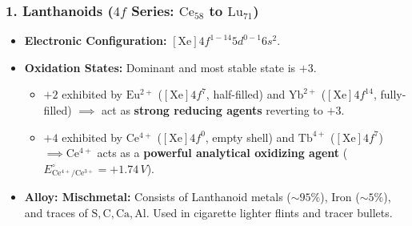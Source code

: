 \documentclass[10pt,twoside,openright]{book}
\begin{document}
\subsubsection{1. Lanthanoids ($4f$ Series: $\mathrm{Ce_{58}}$ to $\mathrm{Lu_{71}}$)}
\begin{itemize}
  \item \textbf{Electronic Configuration:} $[\mathrm{Xe}] 4f^{1-14} 5d^{0-1} 6s^2$.
  \item \textbf{Oxidation States:} Dominant and most stable state is \textbf{$+3$}.
  \begin{itemize}
    \item $+2$ exhibited by $\mathrm{Eu^{2+}}$ ($[\mathrm{Xe}] 4f^7$, half-filled) and $\mathrm{Yb^{2+}}$ ($[\mathrm{Xe}] 4f^{14}$, fully-filled) $\implies$ act as \textbf{strong reducing agents} reverting to $+3$.
    \item $+4$ exhibited by $\mathrm{Ce^{4+}}$ ($[\mathrm{Xe}] 4f^0$, empty shell) and $\mathrm{Tb^{4+}}$ ($[\mathrm{Xe}] 4f^7$) $\implies \mathbf{\mathrm{Ce^{4+}}}$ acts as a \textbf{powerful analytical oxidizing agent} ($E^\circ_{\mathrm{Ce^{4+}/Ce^{3+}}} = +1.74\,\si{V}$).
  \end{itemize}
  \item \textbf{Alloy: Mischmetal:} Consists of Lanthanoid metals ($\sim 95\%$), Iron ($\sim 5\%$), and traces of $\mathrm{S, C, Ca, Al}$. Used in cigarette lighter flints and tracer bullets.
\end{itemize}
\end{document}
